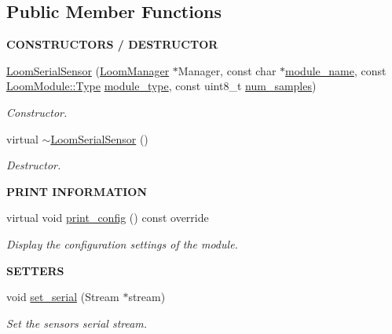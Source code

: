 \subsection*{Public Member Functions}
\begin{Indent}{\bf C\+O\+N\+S\+T\+R\+U\+C\+T\+O\+RS / D\+E\+S\+T\+R\+U\+C\+T\+OR}\par
\begin{DoxyCompactItemize}
\item 
\hyperlink{class_loom_serial_sensor_a48be57e79600602ee072a1ae0673611c}{Loom\+Serial\+Sensor} (\hyperlink{class_loom_manager}{Loom\+Manager} $\ast$Manager, const char $\ast$\hyperlink{class_loom_module_adf6e68ad7e9fa2acfca7a8a280680764}{module\+\_\+name}, const \hyperlink{class_loom_module_aee91d0a75140d51ee428fc2d4417d865}{Loom\+Module\+::\+Type} \hyperlink{class_loom_module_a152d394f37236a2b159dae19da67eeb0}{module\+\_\+type}, const uint8\+\_\+t \hyperlink{class_loom_sensor_a0e74ebbaecde15ed1c71e1bb6bc6aebe}{num\+\_\+samples})
\begin{DoxyCompactList}\small\item\em Constructor. \end{DoxyCompactList}\item 
virtual \hyperlink{class_loom_serial_sensor_a7021e88baa9fa7d1e89a960b22b5aa0e}{$\sim$\+Loom\+Serial\+Sensor} ()
\begin{DoxyCompactList}\small\item\em Destructor. \end{DoxyCompactList}\end{DoxyCompactItemize}
\end{Indent}
\begin{Indent}{\bf P\+R\+I\+NT I\+N\+F\+O\+R\+M\+A\+T\+I\+ON}\par
\begin{DoxyCompactItemize}
\item 
virtual void \hyperlink{class_loom_serial_sensor_ac21a512699c90db3b4287798e1526f0c}{print\+\_\+config} () const override
\begin{DoxyCompactList}\small\item\em Display the configuration settings of the module. \end{DoxyCompactList}\end{DoxyCompactItemize}
\end{Indent}
\begin{Indent}{\bf S\+E\+T\+T\+E\+RS}\par
\begin{DoxyCompactItemize}
\item 
void \hyperlink{class_loom_serial_sensor_a5ad2e2d33d2d371325e9913c85023aa1}{set\+\_\+serial} (Stream $\ast$stream)
\begin{DoxyCompactList}\small\item\em Set the sensor\textquotesingle{}s serial stream. \end{DoxyCompactList}\end{DoxyCompactItemize}
\end{Indent}

